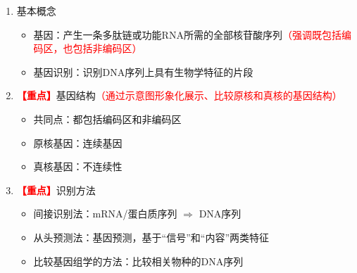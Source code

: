 \documentclass{TIJMUjiaoanLL}
\begin{document}
\begin{enumerate}
  \item 基本概念
    \begin{itemize}
      \item 基因：产生一条多肽链或功能RNA所需的全部核苷酸序列\textcolor{red}{（强调既包括编码区，也包括非编码区）}
      \item 基因识别：识别DNA序列上具有生物学特征的片段
    \end{itemize}
  \item \textcolor{red}{\textbf{【重点】}}基因结构\textcolor{red}{（通过示意图形象化展示、比较原核和真核的基因结构）}
    \begin{itemize}
      \item 共同点：都包括编码区和非编码区
      \item 原核基因：连续基因
      \item 真核基因：不连续性
    \end{itemize}
  \item \textcolor{red}{\textbf{【重点】}}识别方法
    \begin{itemize}
      \item 间接识别法：mRNA/蛋白质序列 $\Rightarrow$ DNA序列
      \item 从头预测法：基因预测，基于“信号”和“内容”两类特征
      \item 比较基因组学的方法：比较相关物种的DNA序列
    \end{itemize}


\otherTail
\newpage
\otherHeader



\end{enumerate}
\end{document}
